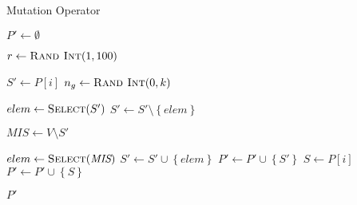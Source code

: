 \begin{algorithm}[h]
  \caption{Mutation Operator}\label{alg:GENETIKUS_ALGORITMUS:MUTACIO}
  \begin{algorithmic}[1]
    \State $P' \leftarrow \emptyset$

    \State $r \leftarrow \Call{Rand Int}{1, 100}$

    \State $S' \leftarrow P[i]$
    \State $n_{g} \leftarrow \Call{Rand Int}{0, k}$

    \State $elem \leftarrow \Call{Select}{S'}$
    \State $S' \leftarrow S' \setminus \left\{ elem \right\}$
    \EndFor

    \State $\textit{MIS} \leftarrow V \setminus S'$

    \State $elem \leftarrow \Call{Select}{\textit{MIS}}$
    \State $S' \leftarrow S' \cup \left\{ elem \right\}$
    \EndWhile
    \State $P' \leftarrow P' \cup \left\{ S' \right\}$
    \Else
    \State $S \leftarrow P\left[ i \right]$
    \State $P' \leftarrow P' \cup \left\{ S \right\}$
    \EndIf
    \EndFor

    \State \Return $P'$
    \EndFunction
  \end{algorithmic}
\end{algorithm}
